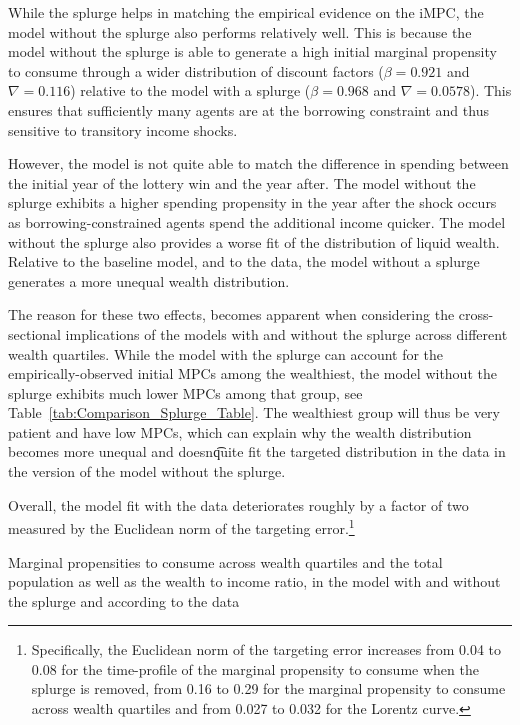 \documentclass[\econtexRoot/HAFiscal]{subfiles}
\begin{document}
While the splurge helps in matching the empirical evidence on the iMPC, the model without the splurge also performs relatively well.
This is because the model without the splurge is able to generate a high initial marginal propensity to consume through a wider distribution of discount factors ($\beta = 0.921$ and $\nabla=0.116$) relative to the model with a splurge ($\beta = 0.968$ and $\nabla=0.0578$).
This ensures that sufficiently many agents are at the borrowing constraint and thus sensitive to transitory income shocks.

However, the model is not quite able to match the difference in spending between the initial year of the lottery win and the year after.
The model without the splurge exhibits a higher spending propensity in the year after the shock occurs as borrowing-constrained agents spend the additional income quicker.
The model without the splurge also provides a worse fit of the distribution of liquid wealth.
Relative to the baseline model, and to the data, the model without a splurge generates a more unequal wealth distribution.


The reason for these two effects, becomes apparent when considering the cross-sectional implications of the models with and without the splurge across different wealth quartiles.
While the model with the splurge can account for the empirically-observed initial MPCs among the wealthiest, the model without the splurge exhibits much lower MPCs among that group, see Table~\ref{tab:Comparison_Splurge_Table}.
The wealthiest group will thus be very patient and have low MPCs, which can explain why the wealth distribution becomes more unequal and doesn\t quite fit the targeted distribution in the data in the version of the model without the splurge.


Overall, the model fit with the data deteriorates roughly by a factor of two measured by the Euclidean norm of the targeting error.\footnote{Specifically, the Euclidean norm of the targeting error increases from 0.04 to 0.08 for the time-profile of the marginal propensity to consume when the splurge is removed, from 0.16 to 0.29 for the marginal propensity to consume across wealth quartiles and from 0.027 to 0.032 for the Lorentz curve.} 

\begin{table}[t]
	\center
	
	\caption{Marginal propensities to consume across wealth quartiles and the total population as well as the wealth to income ratio, in the model with and without the splurge and according to the data}
	\notinsubfile{\label{tab:Comparison_Splurge_Table}}
\end{table}
\end{document}
